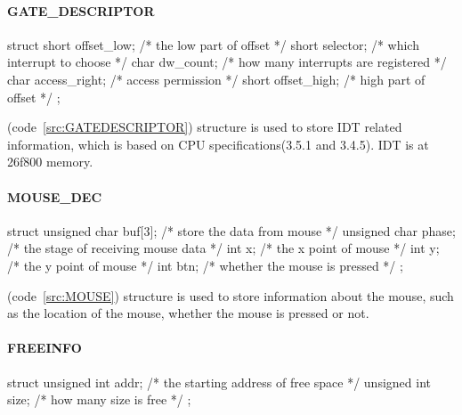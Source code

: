 \documentclass{swfcthesis}
\begin{document}
\paragraph{GATE\_DESCRIPTOR}

\begin{listing}[H]
  \begin{codeblock}
\begin{ccode}
struct 
{ 
  short offset_low;   /* the low part of offset */
  short selector;     /* which interrupt to choose */
  char dw_count;      /* how many interrupts are registered */
  char access_right;  /* access permission */
  short  offset_high; /* high part of offset */
};
\end{ccode}
  \end{codeblock}
  \caption{\emph{struct GATE\_DESCRIPTOR}}\label{src:GATEDESCRIPTOR}
\end{listing}

(code~\ref{src:GATEDESCRIPTOR}) structure is used to
store IDT related information, which is based on CPU specifications(3.5.1 and
3.4.5\cite{intel_3a}). IDT is at 26f800 memory.


\paragraph{MOUSE\_DEC}

\begin{listing}[H]
  \begin{codeblock}
\begin{ccode}
struct 
{ 
  unsigned char buf[3]; /* store the data from mouse */
  unsigned char phase;  /* the stage of receiving mouse data */
  int x;                /* the x point of mouse */
  int y;                /* the y point of mouse */
  int btn;              /* whether the mouse is pressed */
};
\end{ccode}
  \end{codeblock}
  \caption{\emph{struct MOUSE\_DEC}}\label{src:MOUSE}
\end{listing}

(code~\ref{src:MOUSE}) structure is used to store information about the mouse, such as the
location of the mouse, whether the mouse is pressed or not.

\paragraph{FREEINFO}

\begin{listing}[H]
  \begin{codeblock}
\begin{ccode}
struct 
{ 
  unsigned int addr; /* the starting address of free space */
  unsigned int size; /* how many size is free */
};
\end{ccode}
  \end{codeblock}
  \caption{\emph{struct FREEINFO}}\label{src:FREEINFO}
\end{listing}
\end{document}
